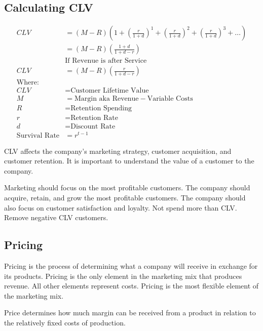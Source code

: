 \subsection{Calculating CLV}
{\scriptsize \begin{align*}
	CLV &= (M-R)\left(1+\left(\frac{r}{1+d}\right)^1+\left(\frac{r}{1+d}\right)^2+\left(\frac{r}{1+d}\right)^3 + \ldots \right) \\
	&= (M-R)\left(\frac{1+d}{1+d-r}\right) \\
	&\text{If Revenue is after Service} \\
	CLV &= (M-R)\left(\frac{r}{1+d-r}\right) \\
	\text{Where:} \\
	CLV &= \text{Customer Lifetime Value} \\
	M &= \text{Margin aka Revenue} - \text{Variable Costs} \\
	R &= \text{Retention Spending} \\
	r &= \text{Retention Rate} \\
	d &= \text{Discount Rate}\\
	\text{Survival Rate} &= r^{t-1}
\end{align*}}

CLV affects the company's marketing strategy, customer acquisition, and customer retention. It is important to understand the value of a customer to the company.

Marketing should focus on the most profitable customers. The company should acquire, retain, and grow the most profitable customers. The company should also focus on customer satisfaction and loyalty. Not spend more than CLV. Remove negative CLV customers.

\subsection{Pricing}
Pricing is the process of determining what a company will receive in exchange for its products. Pricing is the only element in the marketing mix that produces revenue. All other elements represent costs. Pricing is the most flexible element of the marketing mix.

Price determines how much margin can be received from a product in relation to the relatively fixed costs of production.

